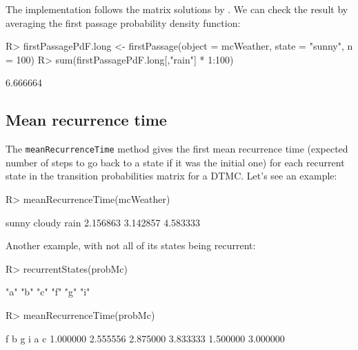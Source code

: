 \documentclass[
  nojss]{jss}
\begin{document}
The implementation follows the matrix solutions by \citep{GrinsteadSnell}. We can check the result by averaging the first passage probability density function:

\begin{CodeChunk}

\begin{CodeInput}
R> firstPassagePdF.long <- firstPassage(object = mcWeather, state = "sunny",  n = 100)
R> sum(firstPassagePdF.long[,"rain"] * 1:100)
\end{CodeInput}

\begin{CodeOutput}
[1] 6.666664
\end{CodeOutput}
\end{CodeChunk}

\hypertarget{mean-recurrence-time}{%
\subsection{Mean recurrence time}\label{mean-recurrence-time}}

The \texttt{meanRecurrenceTime} method gives the first mean recurrence time (expected number of steps to go back to a state if it was the initial one) for each recurrent state in the transition probabilities matrix for a DTMC. Let's see an example:

\begin{CodeChunk}

\begin{CodeInput}
R> meanRecurrenceTime(mcWeather)
\end{CodeInput}

\begin{CodeOutput}
   sunny   cloudy     rain 
2.156863 3.142857 4.583333 
\end{CodeOutput}
\end{CodeChunk}

Another example, with not all of its states being recurrent:

\begin{CodeChunk}

\begin{CodeInput}
R> recurrentStates(probMc)
\end{CodeInput}

\begin{CodeOutput}
[1] "a" "b" "c" "f" "g" "i"
\end{CodeOutput}

\begin{CodeInput}
R> meanRecurrenceTime(probMc)
\end{CodeInput}

\begin{CodeOutput}
       f        b        g        i        a        c 
1.000000 2.555556 2.875000 3.833333 1.500000 3.000000 
\end{CodeOutput}
\end{CodeChunk}
\end{document}
